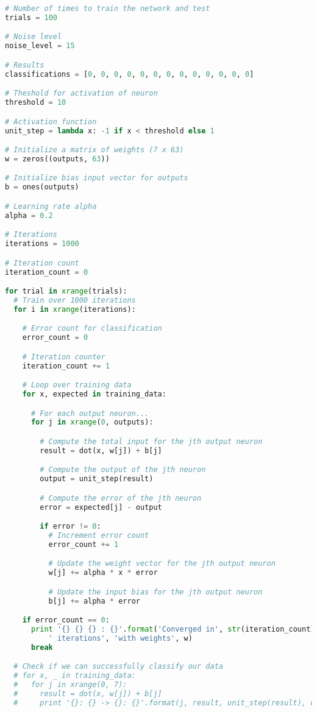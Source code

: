 \documentclass{article}
\begin{document}
\begin{lstlisting}[language=Python]
# Number of times to train the network and test
trials = 100

# Noise level
noise_level = 15

# Results
classifications = [0, 0, 0, 0, 0, 0, 0, 0, 0, 0, 0, 0, 0]

# Theshold for activation of neuron
threshold = 10

# Activation function
unit_step = lambda x: -1 if x < threshold else 1

# Initialize a matrix of weights (7 x 63)
w = zeros((outputs, 63))

# Initialize bias input vector for outputs
b = ones(outputs)

# Learning rate alpha
alpha = 0.2

# Iterations
iterations = 1000

# Iteration count
iteration_count = 0

for trial in xrange(trials):
  # Train over 1000 iterations
  for i in xrange(iterations):

    # Error count for classification
    error_count = 0

    # Iteration counter
    iteration_count += 1

    # Loop over training data
    for x, expected in training_data:

      # For each output neuron...
      for j in xrange(0, outputs):

        # Compute the total input for the jth output neuron
        result = dot(x, w[j]) + b[j]

        # Compute the output of the jth neuron
        output = unit_step(result)

        # Compute the error of the jth neuron
        error = expected[j] - output

        if error != 0:
          # Increment error count
          error_count += 1

          # Update the weight vector for the jth output neuron
          w[j] += alpha * x * error

          # Update the input bias for the jth output neuron
          b[j] += alpha * error

    if error_count == 0:
      print '{} {} {} : {}'.format('Converged in', str(iteration_count) + 
      	  ' iterations', 'with weights', w)
      break

  # Check if we can successfully classify our data
  # for x, _ in training_data:
  #   for j in xrange(0, 7):
  #     result = dot(x, w[j]) + b[j]
  #     print '{}: {} -> {}: {}'.format(j, result, unit_step(result), categories[j])


\end{lstlisting}
\end{document}

